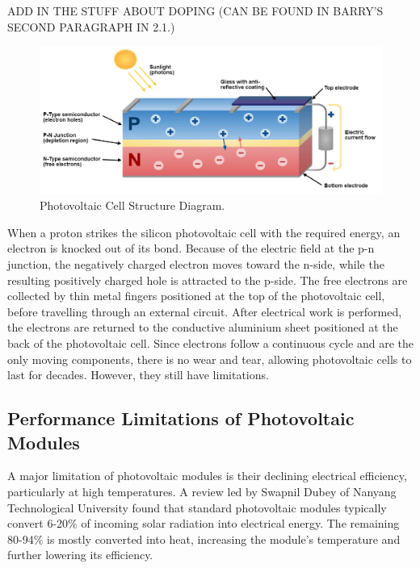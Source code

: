 \noindent ADD IN THE STUFF ABOUT DOPING (CAN BE FOUND IN BARRY'S SECOND PARAGRAPH IN 2.1.)

\begin{figure}[ht]
    \centering
    \includegraphics[width=1\textwidth]{Figures/photovoltaic_cell_diagram.jpg}
    \caption{Photovoltaic Cell Structure Diagram. \cite{Gupta2020SolarVehicle}}
    \label{fig:photovoltaic_cell_diagram}
\end{figure}
\FloatBarrier

\noindent When a proton strikes the silicon photovoltaic cell with the required energy, an electron is knocked out of its bond. Because of the electric field at the p-n junction, the negatively charged electron moves toward the n-side, while the resulting positively charged hole is attracted to the p-side. The free electrons are collected by thin metal fingers positioned at the top of the photovoltaic cell, before travelling through an external circuit. After electrical work is performed, the electrons are returned to the conductive aluminium sheet positioned at the back of the photovoltaic cell. Since electrons follow a continuous cycle and are the only moving components, there is no wear and tear, allowing photovoltaic cells to last for decades. \cite{TED-Ed2016HowKomp} However, they still have limitations.\vspace{0.5em}

\pagebreak
\subsection{Performance Limitations of Photovoltaic Modules}
A major limitation of photovoltaic modules is their declining electrical efficiency, particularly at high temperatures. A review led by Swapnil Dubey of Nanyang Technological University found that standard photovoltaic modules typically convert 6-20\% of incoming solar radiation into electrical energy. The remaining 80-94\% is mostly converted into heat, increasing the module’s temperature and further lowering its efficiency. \cite{Dubey2013TemperatureReview}\vspace{0.5em}

